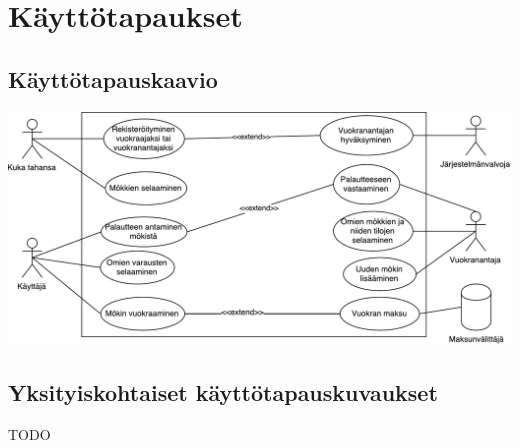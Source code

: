 \chapter{Käyttötapaukset}

\section{Käyttötapauskaavio}
\includegraphics[width = 14cm]{./diagrams/drawio_usecase.pdf}

\section{Yksityiskohtaiset käyttötapauskuvaukset}
TODO